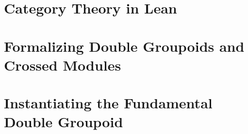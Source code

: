 \section{Category Theory in Lean}

\section{Formalizing Double Groupoids and Crossed Modules}

\section{Instantiating the Fundamental Double Groupoid}
